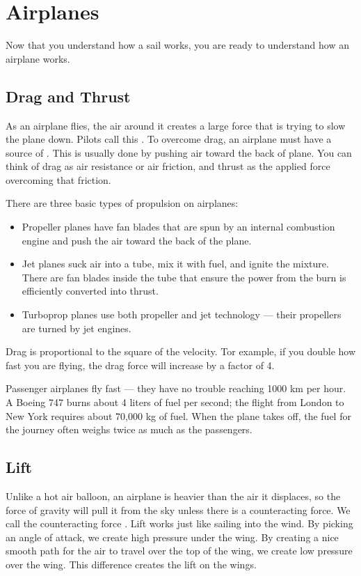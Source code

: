 \chapter{Airplanes}

Now that you understand how a sail works, you are ready to understand how an airplane works.

\section{Drag and Thrust}

As an airplane flies, the air around it creates a large force that is trying to slow the
plane down. Pilots call this .
To overcome drag, an airplane must have a source of . This is usually done by pushing air toward the back of plane. You can think of drag as air resistance or air friction, and thrust as the applied force overcoming that friction.

There are three basic types of propulsion on airplanes:

\begin{itemize}
\item Propeller planes have fan blades that are spun by an internal combustion engine and push the air toward the back of the plane.
\item Jet planes suck air into a tube, mix it with fuel, and ignite the mixture. There are fan blades inside the tube that ensure
the power from the burn is efficiently converted into thrust.
\item Turboprop planes use both propeller and jet technology --- their propellers are turned by jet engines.
\end{itemize}
Drag is proportional to the square of the velocity. Tor example, if you double how fast you are flying, the drag force will increase by a factor of 4.

Passenger airplanes fly fast --- they have no trouble reaching 1000 km per hour. A Boeing 747 burns about 4 liters of fuel per second; the flight from London to New York requires about 70,000 kg of fuel. When the plane takes off, the fuel for the journey often weighs twice as much as the passengers.

\section{Lift}

Unlike a hot air balloon, an airplane is heavier than the
air it displaces, so the force of gravity will pull it from the sky unless there is a counteracting force. We call the counteracting force .
Lift works just like sailing into the wind. By picking an angle of attack, we create high pressure under the wing. By creating a nice smooth path for the
air to travel over the top of the wing, we create low pressure over the wing. This difference creates the lift on the wings.

